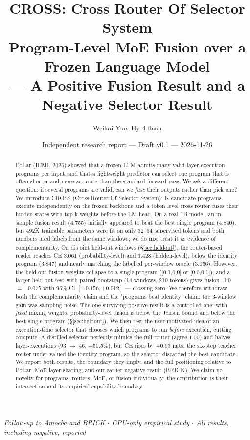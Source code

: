 \documentclass[11pt,a4paper]{article}
\title{\textbf{CROSS: Cross Router Of Selector System}\\
\large Program-Level MoE Fusion over a Frozen Language Model\\
\large --- A Positive Fusion Result and a Negative Selector Result}
\author{Weikai Yue, Hy 4 flash}
\date{Independent research report --- Draft v0.1 --- 2026-11-26}
\begin{document}
\maketitle

\begin{center}
\textit{Follow-up to Amoeba and BRICK \quad $\cdot$ \quad CPU-only empirical study \quad $\cdot$ \quad All results, including negative, reported}
\end{center}

\begin{abstract}
PoLar (ICML 2026) showed that a frozen LLM admits many valid layer-execution
programs per input, and that a lightweight predictor can select one program that
is often shorter and more accurate than the standard forward pass. We ask a
different question: if several programs are valid, can we \emph{fuse} their outputs
rather than pick one? We introduce CROSS (Cross Router Of Selector System): K
candidate programs execute independently on the frozen backbone and a token-level
cross router fuses their hidden states with top-k weights before the LM head.
On a real 1B model, an in-sample fusion result (4.755) initially appeared to beat
the best single program (4.840), but 492K trainable parameters were fit on only
32--64 supervised tokens and both numbers used labels from the same windows; we do
\textbf{not} treat it as evidence of complementarity. On disjoint held-out windows
(\S\ref{sec:heldout}), the router-based reader reaches CE 3.061 (probability-level)
and 3.428 (hidden-level), below the identity program (3.847) and nearly matching
the labelled per-window oracle (3.056). However, the held-out fusion weights
collapse to a single program ([0,1,0,0] or [0,0,0,1]), and a larger held-out test
with paired bootstrap (14 windows, 210 tokens) gives fusion$-$P0 $= -0.075$ with
95\% CI $[-0.156, +0.012]$ --- crossing zero. We therefore withdraw both the
complementarity claim and the "programs beat identity" claim: the 3-window gain
was sampling noise. The one surviving positive result is a controlled one: with
\emph{fixed} mixing weights, probability-level fusion is below the Jensen bound
and below the best single program (\S\ref{sec:heldout}). We then
test the user-motivated idea of an execution-time selector that chooses which
programs to run \emph{before} execution, cutting compute. A distilled selector
perfectly mimics the full router (agree 1.00) and halves layer-executions
(93 $\to$ 46, $-$50.5\%), but CE rises by $+0.93$ nats: the six-step teacher router
under-valued the identity program, so the selector discarded the best candidate.
We report both results, the boundary they imply, and the full positioning relative
to PoLar, MoE layer-sharing, and our earlier negative result (BRICK). We claim
no novelty for programs, routers, MoE, or fusion individually; the contribution
is their intersection and its empirical capability boundary.
\end{abstract}
\end{document}
